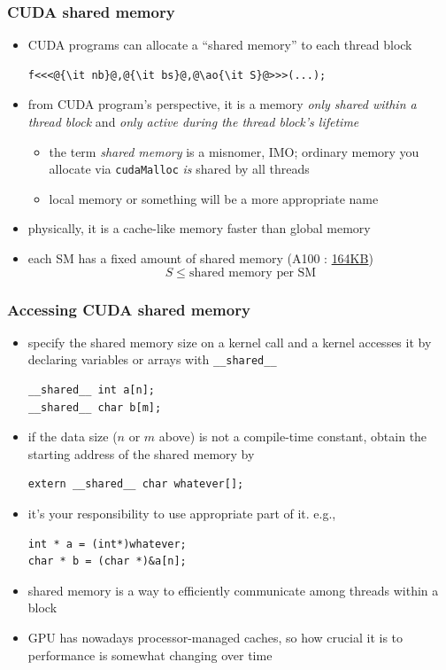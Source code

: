 \documentclass[12pt,dvipdfmx]{beamer}
\newcommand{\ao}[1]{{\color{blue}#1}}
\begin{document}
\begin{frame}[fragile]
  \frametitle{CUDA shared memory}
  \begin{itemize}
  \item CUDA programs can allocate a ``shared memory'' to each thread block

\begin{lstlisting}
f<<<@{\it nb}@,@{\it bs}@,@\ao{\it S}@>>>(...);
\end{lstlisting}

\item from CUDA program's perspective, it is a memory {\it only shared within a thread block} and
  {\it only active during the thread block's lifetime}
  \begin{itemize}
  \item the term {\it shared memory} is a misnomer, IMO;
    ordinary memory you allocate via {\tt cudaMalloc}
    {\it is} shared by all threads
  \item local memory or something will be a more appropriate name
  \end{itemize}
  
\item physically, it is a cache-like memory faster than global memory

\item each SM has a fixed amount of shared memory
  (A100 : \href{https://docs.nvidia.com/cuda/ampere-tuning-guide/index.html#sm-occupancy}{164KB})
  \[ S \leq \mbox{shared memory per SM} \]
  \end{itemize}
\end{frame}

\begin{frame}[fragile]
  \frametitle{Accessing CUDA shared memory}
  \begin{itemize}
  \item specify the shared memory size on a kernel call and 
    a kernel accesses it by declaring variables or arrays with
    \ao{\tt \_\_shared\_\_}
\begin{lstlisting}
__shared__ int a[n];
__shared__ char b[m];
\end{lstlisting}
\item if the data size ($n$ or $m$ above) is not a compile-time constant,
  obtain the starting address of the shared memory by
\begin{lstlisting}
extern __shared__ char whatever[];
\end{lstlisting}
\item it's your responsibility to use appropriate part of it. e.g.,
\begin{lstlisting}
int * a = (int*)whatever;
char * b = (char *)&a[n];
\end{lstlisting}
\item shared memory is a way to efficiently communicate among threads within a block
\item GPU has nowadays processor-managed caches,
  so how crucial it is to performance is somewhat changing over time
\end{itemize}
\end{frame}
\end{document}
